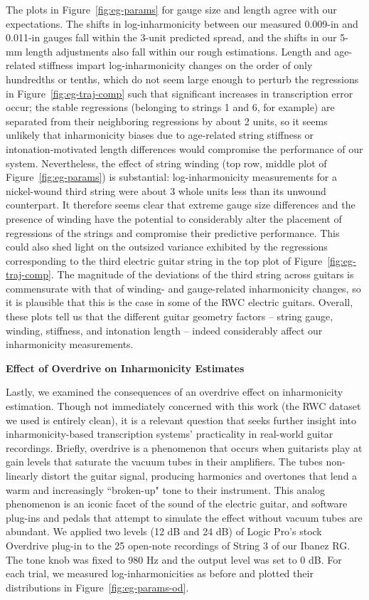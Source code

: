 \documentclass[12pt]{cmuthesis}
\begin{document}
The plots in Figure~\ref{fig:eg-params} for gauge size and length agree with our expectations. The shifts in log-inharmonicity between our measured 0.009-in and 0.011-in gauges fall within the 3-unit predicted spread, and the shifts in our 5-mm length adjustments also fall within our rough estimations. Length and age-related stiffness impart log-inharmonicity changes on the order of only hundredths or tenths, which do not seem large enough to perturb the regressions in Figure~\ref{fig:eg-traj-comp} such that significant increases in transcription error occur; the stable regressions (belonging to strings 1 and 6, for example) are separated from their neighboring regressions by about 2 units, so it seems unlikely that inharmonicity biases due to age-related string stiffness or intonation-motivated length differences would compromise the performance of our system. Nevertheless, the effect of string winding (top row, middle plot of Figure~\ref{fig:eg-params}) is substantial: log-inharmonicity measurements for a nickel-wound third string were about 3 whole units less than its unwound counterpart. It therefore seems clear that extreme gauge size differences and the presence of winding have the potential to considerably alter the placement of regressions of the strings and compromise their predictive performance. This could also shed light on the outsized variance exhibited by the regressions corresponding to the third electric guitar string in the top plot of Figure~\ref{fig:eg-traj-comp}. The magnitude of the deviations of the third string across guitars is commensurate with that of winding- and gauge-related inharmonicity changes, so it is plausible that this is the case in some of the RWC electric guitars. Overall, these plots tell us that the different guitar geometry factors -- string gauge, winding, stiffness, and intonation length -- indeed considerably affect our inharmonicity measurements.

\textbf{Effect of Overdrive on Inharmonicity Estimates}

Lastly, we examined the consequences of an overdrive effect on inharmonicity estimation. Though not immediately concerned with this work (the RWC dataset we used is entirely clean), it is a relevant question that seeks further insight into inharmonicity-based transcription systems' practicality in real-world guitar recordings. Briefly, overdrive is a phenomenon that occurs when guitarists play at gain levels that saturate the vacuum tubes in their amplifiers. The tubes non-linearly distort the guitar signal, producing harmonics and overtones that lend a warm and increasingly ``broken-up" tone to their instrument. This analog phenomenon is an iconic facet of the sound of the electric guitar, and software plug-ins and pedals that attempt to simulate the effect without vacuum tubes are abundant. We applied two levels (12 dB and 24 dB) of Logic Pro's stock Overdrive plug-in to the 25 open-note recordings of String 3 of our Ibanez RG. The tone knob was fixed to 980 Hz and the output level was set to 0 dB. For each trial, we measured log-inharmonicities as before and plotted their distributions in Figure~\ref{fig:eg-params-od}.
\end{document}
